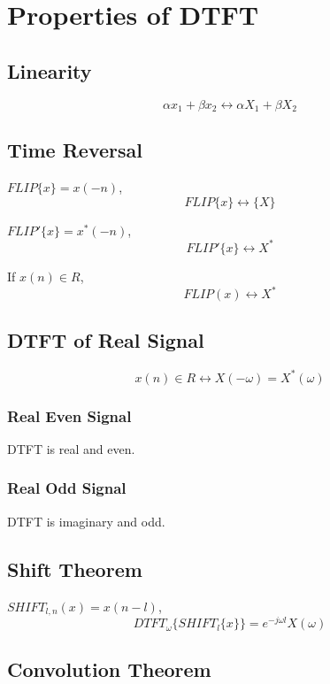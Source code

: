 \documentclass[11pt]{article}
\begin{document}
\section*{Properties of DTFT} \indent

\subsection*{Linearity} \indent

\[\alpha x_1 + \beta x_2 \leftrightarrow \alpha X_1 + \beta X_2\]

\subsection*{Time Reversal} \indent

$FLIP\{x\} = x(-n)$,
\[FLIP\{x\} \leftrightarrow\{X\}\]

$FLIP'\{x\} = x^*(-n)$,
\[FLIP'\{x\} \leftrightarrow X^*\]

If $x(n) \in R$,
\[FLIP(x) \leftrightarrow X^*\]

\subsection*{DTFT of Real Signal}

\[x(n) \in R \leftrightarrow X(-\omega) = X^*(\omega)\]

\subsubsection*{Real Even Signal} \indent

DTFT is real and even.

\subsubsection*{Real Odd Signal} \indent

DTFT is imaginary and odd.

\subsection*{Shift Theorem} \indent

$SHIFT_{l,n}(x) = x(n-l)$,
\[DTFT_\omega\{SHIFT_l\{x\}\} = e^{-j\omega l} X(\omega)\]

\subsection*{Convolution Theorem} \indent
\end{document}
